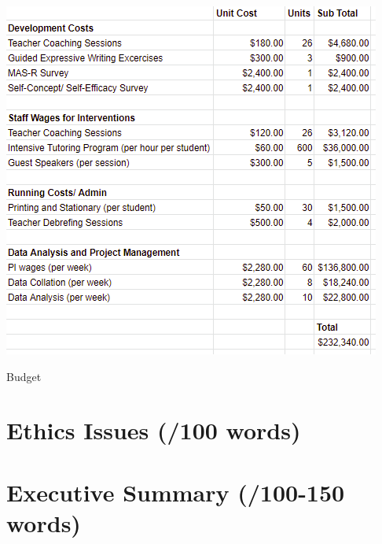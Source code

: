 \documentclass[14pt]{memoir}
\begin{document}
\begin{table}
\begin{center}
\includegraphics{Budget.PNG}
\end{center}
\caption{Budget \label{tab:budget}}
\end{table}



\section{Ethics Issues (/100 words)}

\section{Executive Summary (/100-150 words)}



\printglossaries

\glsresetall

 
\end{document}
